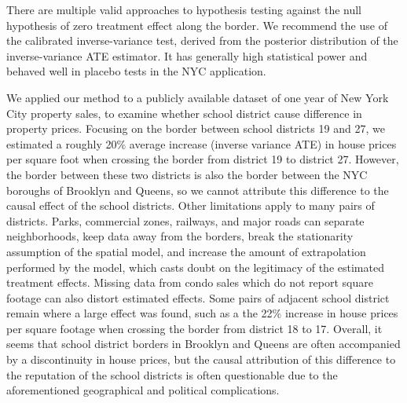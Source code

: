 \documentclass[letter,12pt]{article}
\begin{document}
There are multiple valid approaches to hypothesis testing against the null hypothesis of zero treatment effect along the border.
We recommend the use of the calibrated inverse-variance test, derived from the posterior distribution of the inverse-variance ATE estimator.
It has generally high statistical power and behaved well in placebo tests in the NYC application.



We applied our method to a publicly available dataset of one year of New York City property sales, to examine whether school district cause difference in property prices.
Focusing on the border between school districts 19 and 27, we estimated a roughly 20\% average increase (inverse variance ATE) in house prices per square foot when crossing the border from district 19 to district 27.
However, the border between these two districts is also the border between the NYC boroughs of Brooklyn and Queens, so we cannot attribute this difference to the causal effect of the school districts.
Other limitations apply to many pairs of districts.
Parks, commercial zones, railways, and major roads can separate neighborhoods, keep data away from the borders, break the stationarity assumption of the spatial model, and increase the amount of extrapolation performed by the model, which casts doubt on the legitimacy of the estimated treatment effects.
Missing data from condo sales which do not report square footage can also distort estimated effects.
Some pairs of adjacent school district remain where a large effect was found, such as a the 22\% increase in house prices per square footage when crossing the border from district 18 to 17.
Overall, it seems that school district borders in Brooklyn and Queens are often accompanied by a discontinuity in house prices, but the causal attribution of this difference to the reputation of the school districts is often questionable due to the aforementioned geographical and political complications.
\end{document}
